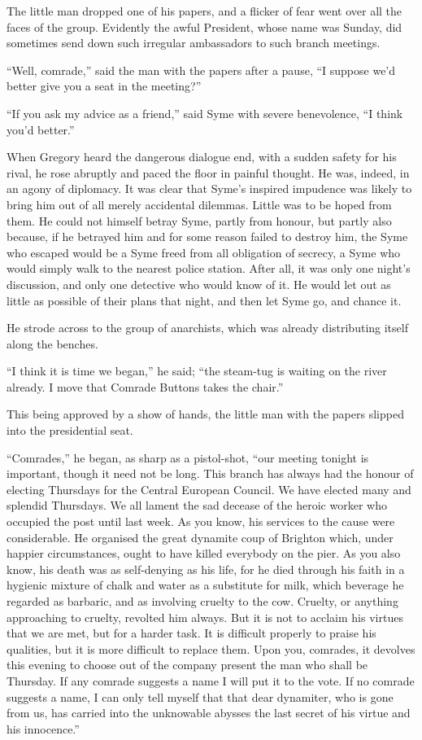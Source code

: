 The little man dropped one of his papers, and a flicker of fear went over all the faces of the group. Evidently the awful President, whose name was Sunday, did sometimes send down such irregular ambassadors to such branch meetings.

“Well, comrade,” said the man with the papers after a pause, “I suppose we’d better give you a seat in the meeting?”

“If you ask my advice as a friend,” said Syme with severe benevolence, “I think you’d better.”

When Gregory heard the dangerous dialogue end, with a sudden safety for his rival, he rose abruptly and paced the floor in painful thought. He was, indeed, in an agony of diplomacy. It was clear that Syme’s inspired impudence was likely to bring him out of all merely accidental dilemmas. Little was to be hoped from them. He could not himself betray Syme, partly from honour, but partly also because, if he betrayed him and for some reason failed to destroy him, the Syme who escaped would be a Syme freed from all obligation of secrecy, a Syme who would simply walk to the nearest police station. After all, it was only one night’s discussion, and only one detective who would know of it. He would let out as little as possible of their plans that night, and then let Syme go, and chance it.

He strode across to the group of anarchists, which was already distributing itself along the benches.

“I think it is time we began,” he said; “the steam-tug is waiting on the river already. I move that Comrade Buttons takes the chair.”

This being approved by a show of hands, the little man with the papers slipped into the presidential seat.

“Comrades,” he began, as sharp as a pistol-shot, “our meeting tonight is important, though it need not be long. This branch has always had the honour of electing Thursdays for the Central European Council. We have elected many and splendid Thursdays. We all lament the sad decease of the heroic worker who occupied the post until last week. As you know, his services to the cause were considerable. He organised the great dynamite coup of Brighton which, under happier circumstances, ought to have killed everybody on the pier. As you also know, his death was as self-denying as his life, for he died through his faith in a hygienic mixture of chalk and water as a substitute for milk, which beverage he regarded as barbaric, and as involving cruelty to the cow. Cruelty, or anything approaching to cruelty, revolted him always. But it is not to acclaim his virtues that we are met, but for a harder task. It is difficult properly to praise his qualities, but it is more difficult to replace them. Upon you, comrades, it devolves this evening to choose out of the company present the man who shall be Thursday. If any comrade suggests a name I will put it to the vote. If no comrade suggests a name, I can only tell myself that that dear dynamiter, who is gone from us, has carried into the unknowable abysses the last secret of his virtue and his innocence.”

